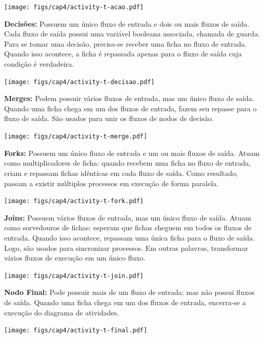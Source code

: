 \documentclass[
  11pt,
  twoside]{book}
\begin{document}
\texttt{[image: figs/cap4/activity-t-acao.pdf]}

\textbf{Decisões:} Possuem um único fluxo de entrada e dois ou mais
fluxos de saída. Cada fluxo de saída possui uma variável booleana
associada, chamada de guarda. Para se tomar uma decisão, precisa-se
receber uma ficha no fluxo de entrada. Quando isso acontece, a ficha é
repassada apenas para o fluxo de saída cuja condição é verdadeira.

\texttt{[image: figs/cap4/activity-t-decisao.pdf]}

\textbf{Merges:} Podem possuir vários fluxos de entrada, mas um único
fluxo de saída. Quando uma ficha chega em um dos fluxos de entrada,
fazem seu repasse para o fluxo de saída. São usados para unir os fluxos
de nodos de decisão.

\texttt{[image: figs/cap4/activity-t-merge.pdf]}

\textbf{Forks:} Possuem um único fluxo de entrada e um ou mais fluxos de
saída. Atuam como multiplicadores de ficha: quando recebem uma ficha no
fluxo de entrada, criam e repassam fichas idênticas em cada fluxo de
saída. Como resultado, passam a existir múltiplos processos em execução
de forma paralela.

\texttt{[image: figs/cap4/activity-t-fork.pdf]}

\textbf{Joins:} Possuem vários fluxos de entrada, mas um único fluxo de
saída. Atuam como sorvedouros de fichas: esperam que fichas cheguem em
todos os fluxos de entrada. Quando isso acontece, repassam uma única
ficha para o fluxo de saída. Logo, são usados para sincronizar
processos. Em outras palavras, transformar vários fluxos de execução em
um único fluxo.

\texttt{[image: figs/cap4/activity-t-join.pdf]}

\textbf{Nodo Final:} Pode possuir mais de um fluxo de entrada; mas não
possui fluxos de saída. Quando uma ficha chega em um dos fluxos de
entrada, encerra-se a execução do diagrama de atividades.

\texttt{[image: figs/cap4/activity-t-final.pdf]}
\end{document}
